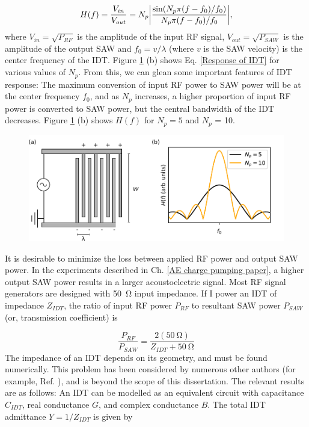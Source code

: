 \documentclass[double,12pt,1in]{beavtex}
\begin{document}
\begin{equation}
    \begin{split}
        H(f) = \frac{V_{in}}{V_{out}} = N_p \abs{\frac{\sin (N_p \pi (f-f_0) / f_0)}{N_p \pi (f-f_0) / f_0}},
    \end{split}
    \label{Response of IDT}
\end{equation}
where $V_{in} = \sqrt{P_{RF}}$ is the amplitude of the input RF signal, $V_{out} = \sqrt{P_{SAW}}$ is the amplitude of the output SAW and $f_0 = v/\lambda$ (where $v$ is the SAW velocity) is the center frequency of the IDT. Figure \ref{SAW diagram} (b) shows Eq. \ref{Response of IDT} for various values of $N_p$. From this, we can glean some important features of IDT response: The maximum conversion of input RF power to SAW power will be at the center frequency $f_0$, and as $N_p$ increases, a higher proportion of input RF power is converted to SAW power, but the central bandwidth of the IDT decreases. Figure \ref{SAW diagram} (b) shows $H(f)$ for $N_p = 5$ and $N_p$ = 10.

\begin{figure}
    \includegraphics{SAW diagram.pdf}
    \caption{}
    \label{SAW diagram}
\end{figure}

It is desirable to minimize the loss between applied RF power and output SAW power. In the experiments described in Ch. \ref{AE charge pumping paper}, a higher output SAW power results in a larger acoustoelectric signal. Most RF signal generators are designed with \SI{50}{\ohm} input impedance. If I power an IDT of impedance $Z_{IDT}$, the ratio of input RF power $P_{RF}$ to resultant SAW power $P_{SAW}$ (or, transmission coefficient) is

\begin{equation}
    \frac{P_{RF}}{P_{SAW}} = \frac{2 (\SI{50}{\ohm})}{Z_{IDT} + \SI{50}{\ohm}} \label{transmission coefficient}
\end{equation}
The impedance of an IDT depends on its geometry, and must be found numerically. This problem has been considered by numerous other authors (for example, Ref. \cite{smith_analysis_1969}), and is beyond the scope of this dissertation. The relevant results are as follows: An IDT can be modelled as an equivalent circuit with capacitance $C_{IDT}$, real conductance $G$, and complex conductance $B$. The total IDT admittance $Y = 1/Z_{IDT}$ is given by 
\end{document}
